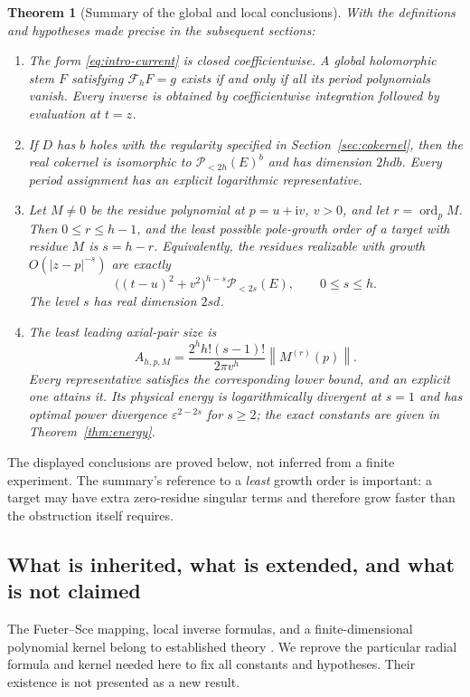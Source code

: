 \documentclass[11pt,a4paper]{article}
\numberwithin{equation}{section}
\newtheorem{theorem}{Theorem}[section]
\theoremstyle{definition}
\theoremstyle{remark}
\newcommand{\ii}{\mathrm i}
\newcommand{\Fu}{\mathcal F_h}
\newcommand{\PP}{\mathscr P_{<2h}(E)}
\newcommand{\PPl}[1]{\mathscr P_{<#1}(E)}
\newcommand{\ord}{\operatorname{ord}}
\newcommand{\norm}[1]{\left\lVert#1\right\rVert}
\begin{document}
\begin{theorem}[Summary of the global and local conclusions]\label{thm:summary}
With the definitions and hypotheses made precise in the subsequent sections:
\begin{enumerate}[label=\textup{(\roman*)},leftmargin=2em]
\item The form \eqref{eq:intro-current} is closed coefficientwise. A global
holomorphic stem $F$ satisfying $\Fu F=g$ exists if and only if all its period
polynomials vanish. Every inverse is obtained by coefficientwise integration
followed by evaluation at $t=z$.
\item If $D$ has $b$ holes with the regularity specified in
Section~\ref{sec:cokernel}, then the real cokernel is isomorphic to
$\PP^b$ and has dimension $2hdb$. Every period assignment has an explicit
logarithmic representative.
\item Let $M\ne0$ be the residue polynomial at $p=u+\ii v$, $v>0$, and let
$r=\ord_p M$. Then $0\le r\le h-1$, and the least possible pole-growth
order of a target with residue $M$ is $s=h-r$. Equivalently, the residues
realizable with growth $O(|z-p|^{-s})$ are exactly
\[
 \bigl((t-u)^2+v^2\bigr)^{h-s}\PPl{2s},\qquad 0\le s\le h.
\]
The level $s$ has real dimension $2sd$.
\item The least leading axial-pair size is
\[
 A_{h,p,M}=\frac{2^h h!(s-1)!}{2\pi v^h}\norm{M^{(r)}(p)}.
\]
Every representative satisfies the corresponding lower bound, and an explicit
one attains it. Its physical energy is logarithmically divergent at $s=1$ and
has optimal power divergence $\varepsilon^{2-2s}$ for $s\ge2$; the exact
constants are given in Theorem~\ref{thm:energy}.
\end{enumerate}
\end{theorem}

The displayed conclusions are proved below, not inferred from a finite
experiment. The summary's reference to a \emph{least} growth order is important:
a target may have extra zero-residue singular terms and therefore grow faster
than the obstruction itself requires.

\subsection{What is inherited, what is extended, and what is not claimed}

The Fueter--Sce mapping, local inverse formulas, and a finite-dimensional
polynomial kernel belong to established theory
\cite{colombo2014,colombo2013,demartino2023}. We reprove the particular radial
formula and kernel needed here to fix all constants and hypotheses. Their
existence is not presented as a new result.
\end{document}
